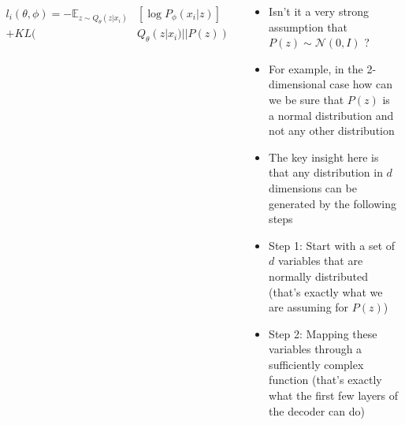\begin{frame}
\begin{columns}
\begin{overlayarea}{\textwidth}{\textheight}
			\vspace{-0.6cm}
			\begin{align*}
				l_i(\theta,\phi)=-\mathbb{E}_{z \sim Q_{\theta}(z|x_i)}& [\log P_{\phi}(x_i|z)] \\
				+ KL(&Q_{\theta}(z|x_i)||P(z))
			\end{align*}
		\end{overlayarea}
		\begin{overlayarea}{\textwidth}{\textheight}
			\begin{itemize}\justifying
				\item<1-> Isn't it a very strong assumption that $P(z) \sim \mathcal{N}(0, I)$ ?
				\item<2-> For example, in the 2-dimensional case how can we be sure that $P(z)$ is a normal distribution and not any other distribution
				\item<3-> The key insight here is that any distribution in $d$ dimensions can be generated by the following steps
				\item<4-> Step 1: Start with a set of $d$ variables that are normally distributed (that's exactly what we are assuming for $P(z)$)
				\item<5-> Step 2: Mapping these variables through a sufficiently complex function (that's exactly what the first few layers of the decoder can do)
			\end{itemize}
		\end{overlayarea}
	\end{columns}
\end{frame}


